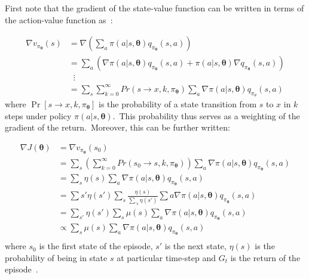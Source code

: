 \documentclass[../xlapes02]{subfiles}
\begin{document}
    First note that the gradient of the state-value function can be
    written in terms of the action-value function as~\cite{sutton2018reinforcement}:


    \begin{equation}
        \label{eq:policy-gradient-theorem-1}
        \begin{split}
            \nabla v_{\pi_{\bm{\theta}}}(s)&=\nabla\left(\sum_{a}\pi(a|s,\bm{\theta})q_{\pi_{\bm{\theta}}}(s,a)\right)\\
            &=\sum_{a}(\nabla\pi(a|s,\bm{\theta})q_{\pi_{\bm{\theta}}}(s,a)+\pi(a|s,\bm{\bm{\theta}})\nabla q_{\pi_{\bm{\theta}}}(s,a))\\
            &\mspace{10mu}\vdots\\
            &=\sum_{s}\sum_{k=0}^{\infty}Pr(s\rightarrow x,k,\pi_{\bm{\theta}})\sum_{a}\nabla\pi(a|s,\bm{\theta})q_{\pi_\theta}(s,a)
        \end{split}
    \end{equation}
    where $\Pr\left[s \rightarrow x, k, \pi_{\bm{\theta}}\right]$ is the probability of a state transition from $s$ to $x$ in $k$ steps under policy $\pi(a | s, \bm{\theta})$.\ This probability thus serves as a weighting of the gradient of the return.\ Moreover, this can be further written:

    \begin{equation}
        \label{eq:policy_gradient}
        \begin{split}
            \nabla J(\bm{\theta})&=\nabla v_{\pi_{\bm{\theta}}}(s_0)\\
            &=\sum_{s}\left(\sum_{k=0}^{\infty}Pr(s_0\rightarrow s,k,\pi_{\bm{\theta}})\right)\sum_{a}\nabla\pi(a|s,\bm{\theta})q_{\pi_{\bm{\theta}}}(s,a)\\
            &=\sum_{s}\eta(s)\sum_{a}\nabla\pi(a|s,\bm{\theta})q_{\pi_{\bm{\theta}}}(s,a)\\
            &=\sum{s'}\eta(s')\sum_{s}\frac{\eta(s)}{\sum_{'s}\eta(s')}\sum{a}\nabla\pi(a|s,\bm{\theta})q_{\pi_{\bm{\theta}}}(s,a)\\
            &=\sum_{s'}\eta(s')\sum_{s}\mu(s)\sum_{a}\nabla\pi(a|s,\bm{\theta})q_{\pi_{\bm{\theta}}}(s,a)\\
            &\propto\sum_{s}\mu(s)\sum_{a}\nabla\pi(a|s,\bm{\theta})q_{\pi_{\bm{\theta}}}(s,a)\\
        \end{split}
    \end{equation}
    where $s_0$ is the first state of the episode, $s'$ is the next state, $\eta(s)$ is the probability of being in state $s$ at particular time-step and $G_t$ is the return of the episode~\cite{sutton2018reinforcement, FITMT25127}.
\end{document}
